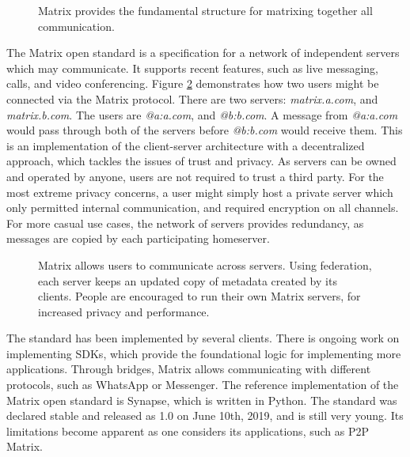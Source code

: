 \begin{figure}
    \centering
    \caption{Matrix provides the fundamental structure for matrixing together all communication.}
    \label{fig:matrixing_together}
\end{figure}

The Matrix open standard\cite{matrix_org_spec} is a specification for a network of independent servers which may communicate.
It supports recent features, such as live messaging, calls, and video conferencing.
Figure \ref{fig:matrix_structure} demonstrates how two users might be connected via the Matrix protocol.
There are two servers: \textit{matrix.a.com}, and \textit{matrix.b.com}.
The users are \textit{@a:a.com}, and \textit{@b:b.com}.
A message from \textit{@a:a.com} would pass through both of the servers before \textit{@b:b.com} would receive them.
This is an implementation of the client-server architecture with a decentralized approach, which tackles the issues of trust and privacy.
As servers can be owned and operated by anyone, users are not required to trust a third party.
For the most extreme privacy concerns, a user might simply host a private server which only permitted internal communication, and required encryption on all channels.
For more casual use cases, the network of servers provides redundancy, as messages are copied by each participating homeserver.

\begin{figure}
    \centering
    \resizebox{0.7\linewidth}{!}{}
    \caption{
        Matrix allows users to communicate across servers.
        Using federation, each server keeps an updated copy of metadata created by its clients.
        People are encouraged to run their own Matrix servers, for increased privacy and performance.
    }
    \label{fig:matrix_structure}
\end{figure}

The standard has been implemented by several clients\cite{matrix_org_clients}.
There is ongoing work on implementing SDKs\cite{matrix_org_sdks}, which provide the foundational logic for implementing more applications.
Through bridges, Matrix allows communicating with different protocols\cite{matrix_org_bridges}, such as WhatsApp or Messenger.
The reference implementation of the Matrix open standard is Synapse\cite{matrix_org_synapse}, which is written in Python.
The standard was declared stable and released as 1.0 on June 10th, 2019\cite{matrix_org_spec}, and is still very young.
Its limitations become apparent as one considers its applications, such as \ac{P2P} Matrix.

